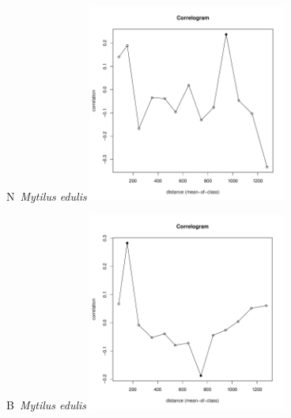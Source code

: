 \documentclass[12pt, a4paper]{disser}
\begin{document}
	\begin{figure}[h]

	\begin{minipage}[b]{.46\linewidth}
	\begin{center}
	{\small N~{\it Mytilus edulis}}
		\includegraphics[width=65mm]{../Barenc_Sea/distribution_Moran/Plyazh082_moran_N_Mytilus_edulis_.pdf}
	\end{center}
	\end{minipage}
%
	\hfil %
%
	\begin{minipage}[b]{.46\linewidth}
	\begin{center}
	{\small B~{\it Mytilus edulis}}
		\includegraphics[width=65mm]{../Barenc_Sea/distribution_Moran/Plyazh082_moran_B_Mytilus_edulis_.pdf}
	\end{center}
	\end{minipage}


\end{figure}
\end{document}
